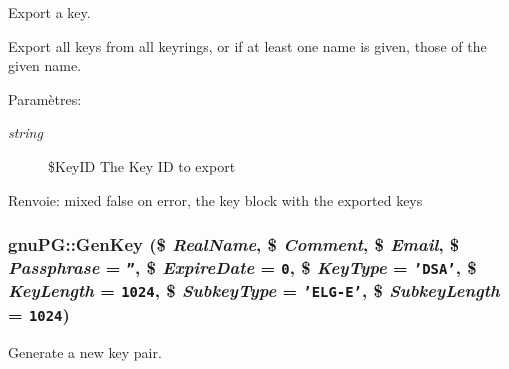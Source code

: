 Export a key.

Export all keys from all keyrings, or if at least one name is given, those of the given name.

\begin{Desc}
\item[Param\`{e}tres:]
\begin{description}
\item[{\em string}]\$Key\-ID The Key ID to export \end{description}
\end{Desc}
\begin{Desc}
\item[Renvoie:]mixed false on error, the key block with the exported keys\end{Desc}
\hypertarget{classgnuPG_a5}{
\subsubsection[GenKey]{\setlength{\rightskip}{0pt plus 5cm}gnu\-PG::Gen\-Key (\$ {\em Real\-Name}, \$ {\em Comment}, \$ {\em Email}, \$ {\em Passphrase} = {\tt ''}, \$ {\em Expire\-Date} = {\tt 0}, \$ {\em Key\-Type} = {\tt 'DSA'}, \$ {\em Key\-Length} = {\tt 1024}, \$ {\em Subkey\-Type} = {\tt 'ELG-E'}, \$ {\em Subkey\-Length} = {\tt 1024})}}
\label{classgnuPG_a5}


Generate a new key pair.


